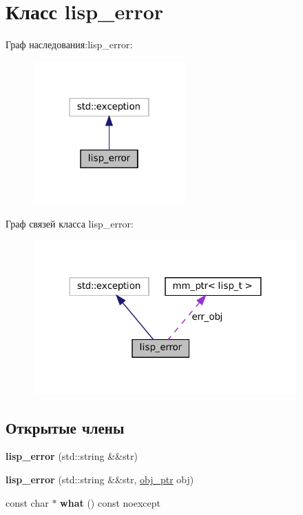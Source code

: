 \hypertarget{classlisp__error}{}\section{Класс lisp\+\_\+error}
\label{classlisp__error}


Граф наследования\+:lisp\+\_\+error\+:\nopagebreak
\begin{figure}[H]
\begin{center}
\leavevmode
\includegraphics[width=166pt]{classlisp__error__inherit__graph}
\end{center}
\end{figure}


Граф связей класса lisp\+\_\+error\+:\nopagebreak
\begin{figure}[H]
\begin{center}
\leavevmode
\includegraphics[width=288pt]{classlisp__error__coll__graph}
\end{center}
\end{figure}
\subsection*{Открытые члены}
\begin{DoxyCompactItemize}
\item 
\mbox{\label{classlisp__error_ae41aa8025571dc7a8fb3686e20909978}} 
{\bfseries lisp\+\_\+error} (std\+::string \&\&str)
\item 
\mbox{\label{classlisp__error_a28cdca7ae82bdb51add8f3ee176a7670}} 
{\bfseries lisp\+\_\+error} (std\+::string \&\&str, \mbox{\hyperlink{classmm__ptr}{obj\+\_\+ptr}} obj)
\item 
\mbox{\label{classlisp__error_a3ef4f940064ddba3557fd8fe5cd74399}} 
const char $\ast$ {\bfseries what} () const noexcept
\end{DoxyCompactItemize}
